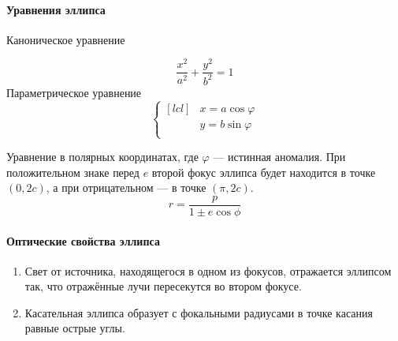 \paragraph{Уравнения эллипса}
\begin{flushleft}
Каноническое уравнение
\end{flushleft}

\begin{equation}
\frac{x^2}{a^2}+\frac{y^2}{b^2}=1
\end{equation}
Параметрическое уравнение
\begin{equation}
\left\{\begin{aligned}[lcl]
&x=a\cos \varphi\\
&y=b\sin \varphi\\
\end{aligned}
\right.
\end{equation}

Уравнение в полярных координатах, где $\varphi$ --- истинная аномалия. При положительном знаке перед $e$ второй фокус эллипса будет находится в точке $(0,2c)$, а при отрицательном --- в точке $(\pi,2c)$.
\begin{equation}
r=\frac{p}{1\pm e\cos\phi}
\end{equation}

\paragraph{Оптические свойства эллипса}
\begin{enumerate}
\item Свет от источника, находящегося в одном из фокусов, отражается эллипсом так, что отражённые лучи пересекутся во втором фокусе.
\item Касательная эллипса образует с фокальными радиусами в точке касания равные острые углы.
\end{enumerate}





 
